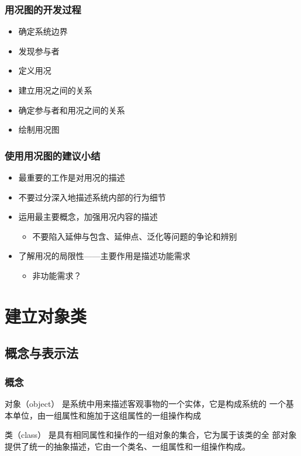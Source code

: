 \documentclass[compress]{beamer}
\begin{document}
  \begin{frame}
    \frametitle{用况图的开发过程}
    \begin{itemize}
      \item 确定系统边界
      \item 发现参与者 
      \item 定义用况 
      \item 建立用况之间的关系 
      \item 确定参与者和用况之间的关系 
      \item 绘制用况图 
    \end{itemize}
  \end{frame}

  \begin{frame}
    \frametitle{使用用况图的建议小结}
    \begin{itemize}
      \item 最重要的工作是对用况的描述
      \item 不要过分深入地描述系统内部的行为细节 
      \item 运用最主要概念，加强用况内容的描述
        \begin{itemize}
          \item 不要陷入延伸与包含、延伸点、泛化等问题的争论和辨别
    \end{itemize}
      \item 了解用况的局限性——主要作用是描述功能需求
        \begin{itemize}
          \item 非功能需求？
        \end{itemize}
    \end{itemize}
  \end{frame}

  \section{建立对象类}

  \subsection{概念与表示法}

  \begin{frame}
    \frametitle{概念}
    \begin{block}{对象（object）}
        是系统中用来描述客观事物的一个实体，它是构成系统的
        一个基本单位，由一组属性和施加于这组属性的一组操作构成
    \end{block}
    \begin{block}{类（class）}
      是具有相同属性和操作的一组对象的集合，它为属于该类的全
      部对象提供了统一的抽象描述，它由一个类名、一组属性和一组操作构成。 

    \end{block}
  \end{frame}
\end{document}
